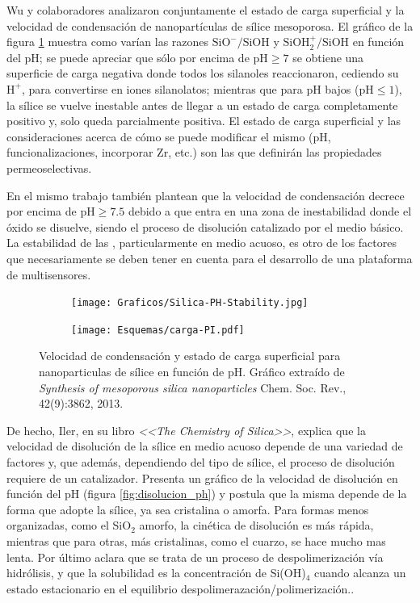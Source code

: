      Wu y colaboradores\cite{Si-HanWu2013} analizaron conjuntamente el estado de carga superficial y la velocidad de condensación de nanopartículas de sílice mesoporosa. El gráfico de la figura \ref{fig:silica_ph} muestra como varían las razones  $\text{SiO}^{-}/\text{SiOH}$ y $\text{SiOH}_2^{+}/\text{SiOH}$ en función del pH; se puede apreciar que sólo por encima de $\text{pH}\geq7$ se obtiene una superficie de carga negativa donde todos los silanoles reaccionaron, cediendo su $\text{H}^{+}$, para convertirse en iones silanolatos; mientras que para pH bajos ($\text{pH}\leq1$), la sílice se vuelve inestable antes de llegar a un estado de carga completamente positivo y, solo queda parcialmente positiva. El estado de carga superficial y las consideraciones acerca de cómo se puede modificar el mismo (pH, funcionalizaciones, incorporar Zr, etc.) son las que definirán las propiedades permeoselectivas.  
	 
	 En el mismo trabajo\cite{Si-HanWu2013} también plantean que la velocidad de condensación decrece por encima de $\text{pH}\geq7.5$ debido a que entra en una zona de inestabilidad donde el óxido se disuelve, siendo el proceso de disolución catalizado por el medio básico. La estabilidad de las \pdm, particularmente en medio acuoso, es otro de los factores que necesariamente se deben  tener en cuenta para el desarrollo de una plataforma de multisensores. 


		\begin{figure}[h!]
			\begin{subfigure}[t]{0.73\textwidth}
 	       	\texttt{[image: Graficos/Silica-PH-Stability.jpg]}
 	       	\end{subfigure}
 	       	\begin{subfigure}[t]{0.25\textwidth}
 	       	 	\texttt{[image: Esquemas/carga-PI.pdf]}
	      	 \end{subfigure}
	    	\caption[Velocidad de condensación y estado de carga superficial]{Velocidad de condensación y estado de carga superficial para nanoparticulas de sílice en función de pH. Gráfico extraído de \textit{Synthesis of mesoporous silica nanoparticles} Chem. Soc. Rev., 42(9):3862, 2013.\cite{Si-HanWu2013}}
	       	\label{fig:silica_ph}
	    	\end{figure}
	    	
	De hecho, Iler, en su libro \textit{<<The Chemistry of Silica>>}, explica que la velocidad de disolución de la sílice en medio acuoso depende de una variedad de factores y, que además, dependiendo del tipo de sílice, el proceso de disolución requiere de un catalizador. Presenta un gráfico de la velocidad de disolución en función del pH (figura \ref{fig:disolucion_ph}) y postula que la misma depende de la forma que adopte la sílice, ya sea cristalina o amorfa. Para formas menos organizadas, como el SiO$_2$ amorfo, la cinética de disolución es más rápida, mientras que para otras, más cristalinas, como el cuarzo, se hace mucho mas lenta. Por último aclara que se trata de un proceso de despolimerización vía hidrólisis, y que la solubilidad es la concentración de Si(OH)$_4$ cuando alcanza un estado estacionario en el equilibrio despolimerazación/polimerización.\cite{iler1979,blesa1994}. 

